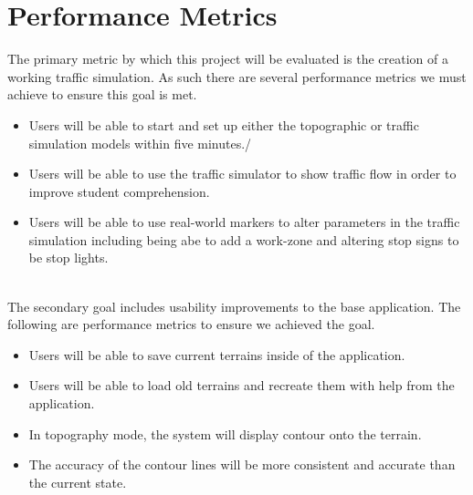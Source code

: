 \documentclass[letterpaper, 10pt, onecolumn, draftclsnofoot]{IEEEtran}
\begin{document}
\section{Performance Metrics}
The primary metric by which this project will be evaluated is the creation of a working traffic simulation. As such there are several performance metrics we must achieve to ensure this goal is met. 
\begin{itemize}
	\item Users will be able to start and set up either the topographic or traffic simulation models within five minutes./ 
	\item Users will be able to use the traffic simulator to show traffic flow in order to improve student comprehension. 
	\item Users will be able to use real-world markers to alter parameters in the traffic simulation including being abe to add a work-zone and altering stop signs to be stop lights. 
\end{itemize}\vspace{5mm}

\\
The secondary goal includes usability improvements to the base application. The following are performance metrics to ensure we achieved the goal. 

\begin{itemize}
	\item Users will be able to save current terrains inside of the application. 
	\item Users will be able to load old terrains and recreate them with help from the application. 
	\item In topography mode, the system will display contour onto the terrain.
	\item The accuracy of the contour lines will be more consistent and accurate than the current state. 
\end{itemize}
\end{document}
